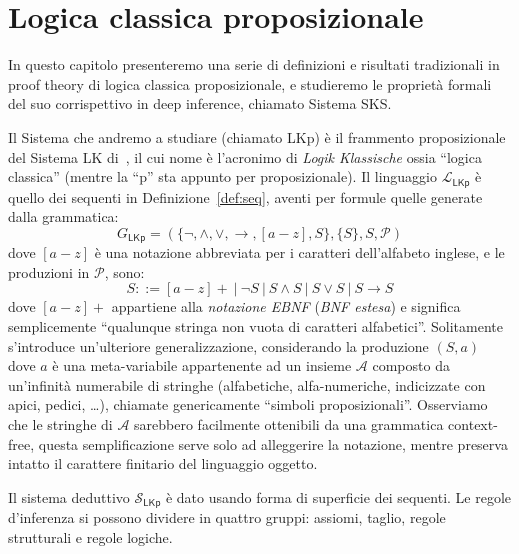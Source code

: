 \documentclass[12pt,a4paper,openright,twoside]{report}
\begin{document}
\chapter{Logica classica proposizionale}
In questo capitolo presenteremo una serie di definizioni e risultati tradizionali in proof theory di logica classica proposizionale, e studieremo le propriet\`a formali del suo corrispettivo in deep inference, chiamato Sistema \textsf{SKS}.

Il Sistema che andremo a studiare (chiamato \textsf{LKp}) \`e il frammento proposizionale del Sistema \textsf{LK} di~\cite{Gen35}, il cui nome \`e l'acronimo di \emph{Logik Klassische} ossia ``logica classica'' (mentre la ``p'' sta appunto per proposizionale). Il linguaggio $\mathscr{L}_{\mathsf{LKp}}$ \`e quello dei sequenti in Definizione~\ref{def:seq}, aventi per formule quelle generate dalla grammatica:
$$
	G_{\mathsf{LKp}} = (\{ \neg, \wedge, \vee, \rightarrow, [a{-}z], S \}, \{ S \}, S, \mathcal{P})
$$
dove $[a{-}z]$ \`e una notazione abbreviata per i caratteri dell'alfabeto inglese, e le produzioni in $\mathcal{P}$, sono:
$$
	S ::= [a{-}z]{+} \:|\: \neg S \:|\: S \wedge S \:|\: S \vee S \:|\: S \rightarrow S
$$
dove $[a{-}z]{+}$ appartiene alla \emph{notazione EBNF} (\emph{BNF estesa}) e significa semplicemente ``qualunque stringa non vuota di caratteri alfabetici''. Solitamente s'introduce un'ulteriore generalizzazione, considerando la produzione $(S,a)$ dove $a$ \`e una meta-variabile appartenente ad un insieme $\mathcal{A}$ composto da un'infinit\`a numerabile di stringhe (alfabetiche, alfa-numeriche, indicizzate con apici, pedici, \ldots), chiamate genericamente ``simboli proposizionali''. Osserviamo che le stringhe di $\mathcal{A}$ sarebbero facilmente ottenibili da una grammatica context-free, questa semplificazione serve solo ad alleggerire la notazione, mentre preserva intatto il carattere finitario del linguaggio oggetto.

Il sistema deduttivo $\mathscr{S}_{\mathsf{LKp}}$ \`e dato usando forma di superficie dei sequenti. Le regole d'inferenza si possono dividere in quattro gruppi: assiomi, taglio, regole strutturali e regole logiche. 
\end{document}
